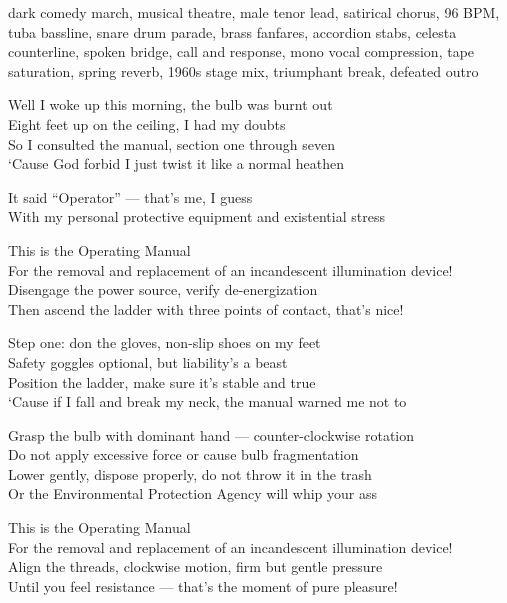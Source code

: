 

\begin{notes}
\end{notes}
\begin{style}
dark comedy march, musical theatre, male tenor lead, satirical chorus, 96 BPM, tuba bassline, snare drum parade, brass fanfares, accordion stabs, celesta counterline, spoken bridge, call and response, mono vocal compression, tape saturation, spring reverb, 1960s stage mix, triumphant break, defeated outro
\end{style}
\begin{lyrics}
Well I woke up this morning, the bulb was burnt out\\
Eight feet up on the ceiling, I had my doubts\\
So I consulted the manual, section one through seven\\
‘Cause God forbid I just twist it like a normal heathen

It said “Operator” — that’s me, I guess\\
With my personal protective equipment and existential stress

This is the Operating Manual\\
For the removal and replacement of an incandescent illumination device!\\
Disengage the power source, verify de-energization\\
Then ascend the ladder with three points of contact, that’s nice!

Step one: don the gloves, non-slip shoes on my feet\\
Safety goggles optional, but liability’s a beast\\
Position the ladder, make sure it’s stable and true\\
‘Cause if I fall and break my neck, the manual warned me not to

Grasp the bulb with dominant hand — counter-clockwise rotation\\
Do not apply excessive force or cause bulb fragmentation\\
Lower gently, dispose properly, do not throw it in the trash\\
Or the Environmental Protection Agency will whip your ass

This is the Operating Manual\\
For the removal and replacement of an incandescent illumination device!\\
Align the threads, clockwise motion, firm but gentle pressure\\
Until you feel resistance — that’s the moment of pure pleasure!


\end{lyrics}

